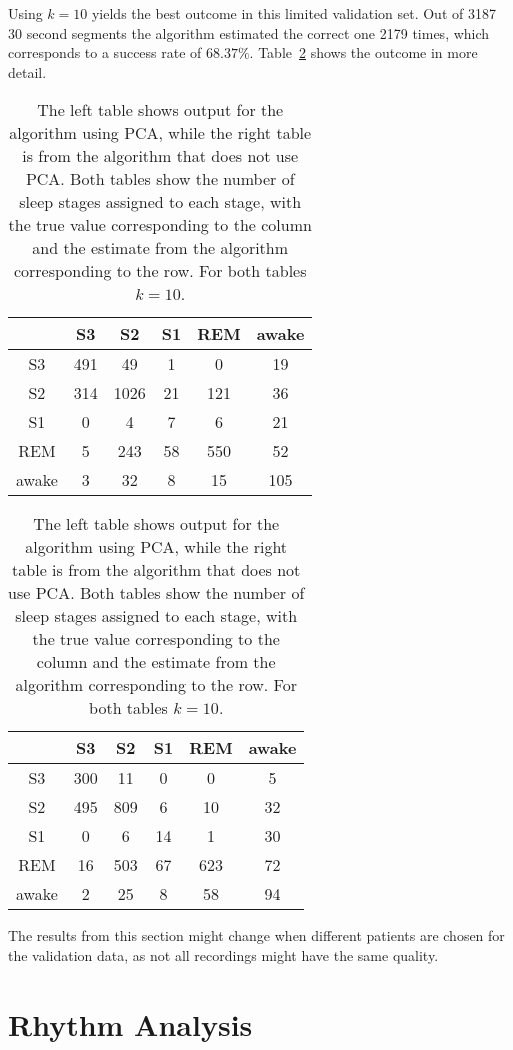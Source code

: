 Using $k=10$ yields the best outcome in this limited validation set. Out of 3187 30 second segments the algorithm estimated the correct one 2179 times, which corresponds to a success rate of $68.37\%$. Table~\ref{tab:error_validation} shows the outcome in more detail.

\begin{table}
	\centering
	\begin{subtable}{0.48\textwidth}
		\begin{tabular}{c|ccccc}
			    & S3  & S2  & S1 & REM & awake \\
			\hline
			S3 & 491  & 49  & 1  & 0  & 19 \\
			S2 & 314  & 1026  & 21  & 121  & 36 \\
			S1 & 0  & 4  & 7  & 6  & 21 \\
			REM & 5  & 243  & 58  & 550  & 52 \\
			awake & 3  & 32  & 8  & 15  & 105 \\
		\end{tabular}
	\end{subtable}
	\hfill
	\begin{subtable}{0.48\textwidth}
		\begin{tabular}{c|ccccc}
			   & S3  & S2  & S1 & REM & awake \\
			\hline
			S3 & 300  & 11  & 0  & 0  & 5 \\
			S2 & 495  & 809  & 6  & 10  & 32 \\
			S1 & 0  & 6  & 14  & 1  & 30 \\
			REM & 16  & 503  & 67  & 623  & 72 \\
			awake & 2  & 25  & 8  & 58  & 94 \\
		\end{tabular}
	\end{subtable}
	
	\caption{The left table shows output for the algorithm using PCA, while the right table is from the algorithm that does not use PCA. Both tables show the number of sleep stages assigned to each stage, with the true value corresponding to the column and the estimate from the algorithm corresponding to the row. For both tables $k=10$.}
	\label{tab:error_validation}
\end{table}

The results from this section might change when different patients are chosen for the validation data, as not all recordings might have the same quality.


\section{Rhythm Analysis}
\label{sec:rhythm_analysis}

